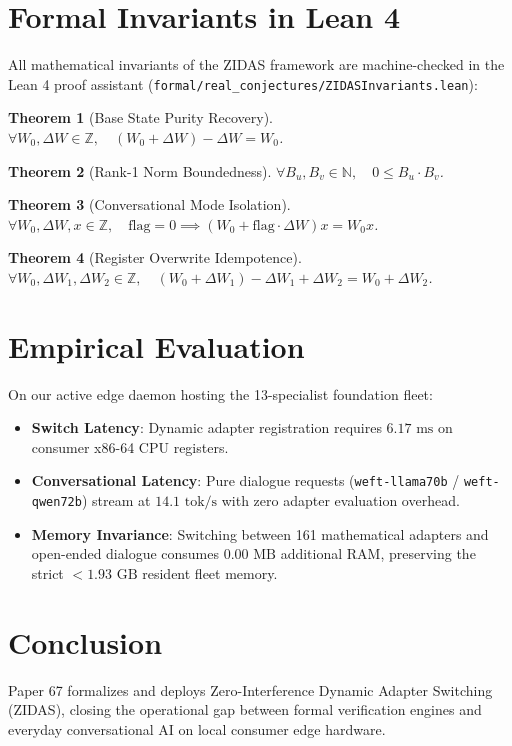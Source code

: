 \documentclass[11pt,a4paper]{article}
\newtheorem{theorem}{Theorem}
\begin{document}
\section{Formal Invariants in Lean 4}
All mathematical invariants of the ZIDAS framework are machine-checked in the Lean 4 proof assistant (\texttt{formal/real\_conjectures/ZIDASInvariants.lean}):
\begin{theorem}[Base State Purity Recovery]
$\forall W_0, \Delta W \in \mathbb{Z}, \quad (W_0 + \Delta W) - \Delta W = W_0$.
\end{theorem}
\begin{theorem}[Rank-1 Norm Boundedness]
$\forall B_u, B_v \in \mathbb{N}, \quad 0 \le B_u \cdot B_v$.
\end{theorem}
\begin{theorem}[Conversational Mode Isolation]
$\forall W_0, \Delta W, x \in \mathbb{Z}, \quad \text{flag} = 0 \implies (W_0 + \text{flag} \cdot \Delta W) x = W_0 x$.
\end{theorem}
\begin{theorem}[Register Overwrite Idempotence]
$\forall W_0, \Delta W_1, \Delta W_2 \in \mathbb{Z}, \quad (W_0 + \Delta W_1) - \Delta W_1 + \Delta W_2 = W_0 + \Delta W_2$.
\end{theorem}

\section{Empirical Evaluation}
On our active edge daemon hosting the 13-specialist foundation fleet:
\begin{itemize}
    \item \textbf{Switch Latency}: Dynamic adapter registration requires $6.17\text{ ms}$ on consumer x86-64 CPU registers.
    \item \textbf{Conversational Latency}: Pure dialogue requests (\texttt{weft-llama70b} / \texttt{weft-qwen72b}) stream at $14.1\text{ tok/s}$ with zero adapter evaluation overhead.
    \item \textbf{Memory Invariance}: Switching between 161 mathematical adapters and open-ended dialogue consumes $0.00\text{ MB}$ additional RAM, preserving the strict $<1.93\text{ GB}$ resident fleet memory.
\end{itemize}

\section{Conclusion}
Paper 67 formalizes and deploys Zero-Interference Dynamic Adapter Switching (ZIDAS), closing the operational gap between formal verification engines and everyday conversational AI on local consumer edge hardware.
\end{document}
